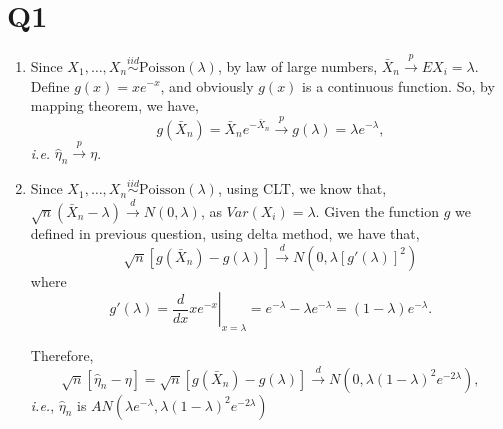 \documentclass[letterpaper]{article}
\newcommand{\convp}{\stackrel{p}{\to}}
\newcommand{\convd}{\stackrel{d}{\to}}
\newcommand{\IID}{\stackrel{iid}{\sim}}
\begin{document}
\section*{Q1}
\begin{enumerate}
\item Since $X_1, \dots, X_n \IID \text{Poisson}(\lambda)$, by law of large numbers, $\bar X_n \convp EX_i = \lambda$.
Define $g(x) = xe^{-x}$, and obviously $g(x)$ is a continuous function. So, by mapping theorem, we have,
\[
g(\bar X_n) = \bar X_n e^{-\bar X_n} \convp g(\lambda) = \lambda e^{-\lambda},
\]
\emph{i.e.} $\hat \eta_n \convp \eta$.
\item Since $X_1, \dots, X_n \IID \text{Poisson}(\lambda)$, using CLT, we know that, $\sqrt{n}(\bar X_n - \lambda) \convd N(0, \lambda)$, as $Var(X_i) = \lambda$. 
Given the function $g$ we defined in previous question, using delta method, we have that,
\[
\sqrt{n}\left[ g(\bar X_n) - g(\lambda) \right] \convd N(0, \lambda [g'(\lambda)]^2)
\]
where 
\[
g'(\lambda) = \left. \frac{d}{dx} xe^{-x} \right|_{x =\lambda} = e^{-\lambda} - \lambda e^{-\lambda} = (1-\lambda) e^{-\lambda}.
\]

Therefore, 
\[
\sqrt{n}[\hat \eta_n - \eta] = \sqrt{n}\left[ g(\bar X_n) - g(\lambda) \right] \convd N(0, \lambda (1-\lambda)^2 e^{-2\lambda}),
\]
\emph{i.e.}, $\hat \eta_n$ is $AN(\lambda e^{-\lambda}, \lambda (1-\lambda)^2 e^{-2\lambda})$
\end{enumerate}
\end{document}
